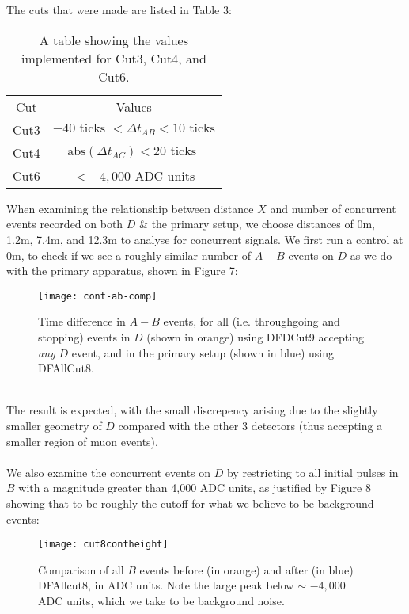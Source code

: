 \documentclass[a4paper]{article}
\begin{document}
\\\\
The cuts that were made are listed in Table 3:
\begin{table}[h!]
\centering
\begin{tabular}{c|c}
Cut  & Values       \\ \cline{1-2}
Cut3 & $ -40 \text{ ticks } < \Delta t_{AB}<10 \text{ ticks}$          \\
Cut4 & $ \text{abs}\left( \Delta t_{AC} \right) < 20 \text{ ticks } $          \\
Cut6 & $< -4,000$ ADC units          
\end{tabular}
\caption{A table showing the values implemented for Cut3, Cut4, and Cut6.}
\end{table}
\newpage \noindent
When examining the relationship between distance $X$ and number of concurrent events recorded on both $D$ \& the primary setup, we choose distances of 0m, 1.2m, 7.4m, and 12.3m to analyse for concurrent signals.
We first run a control at 0m, to check if we see a roughly similar number of $A-B$ events on $D$ as we do with the primary apparatus, shown in Figure 7:
\begin{figure}[h!]
\begin{center}
	\texttt{[image: cont-ab-comp]}
\end{center}
\caption{Time difference in $A-B$ events, for all (i.e. throughgoing and stopping) events in $D$ (shown in orange) using DFDCut9 accepting \textit{any} $D$ event, and in the primary setup (shown in blue) using DFAllCut8.}
\end{figure}
\\
The result is expected, with the small discrepency arising due to the slightly smaller geometry of $D$ compared with the other 3 detectors (thus accepting a smaller region of muon events).
\\\\
We also examine the concurrent events on $D$ by restricting to all initial pulses in $B$ with a magnitude greater than 4,000 ADC units, as justified by Figure 8 showing that to be roughly the cutoff for what we believe to be background events:
\begin{figure}[h!]
\begin{center}
	\texttt{[image: cut8contheight]}
\end{center}
\caption{Comparison of all $B$ events before (in orange) and after (in blue) DFAllcut8, in ADC units. Note the large peak below $\sim$ $-4,000$ ADC units, which we take to be background noise.}
\end{figure}
\end{document}
